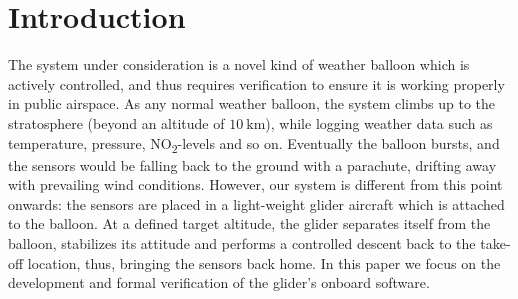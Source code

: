 \section{Introduction}
\label{sec:intro}




The system under consideration is a novel kind of weather balloon
which is actively controlled, and thus requires verification to ensure
it is working properly in public airspace.  As any normal weather
balloon, the system climbs up to the stratosphere (beyond an altitude of $\SI{10}{\kilo\meter}$),
while logging weather data such as temperature, pressure,
NO\textsubscript{2}-levels and so on. Eventually the balloon bursts,
and the sensors would be falling back to the ground with a parachute,
drifting away with prevailing wind conditions. However, our system is
different from this point onwards: the sensors are placed in a
light-weight glider aircraft which is attached to the balloon. At a
defined target altitude, the glider separates itself from the balloon,
stabilizes its attitude and performs a controlled descent back to the
take-off location, thus, bringing the sensors back home. In this paper
we focus on the development and formal verification of the glider's
onboard software.

